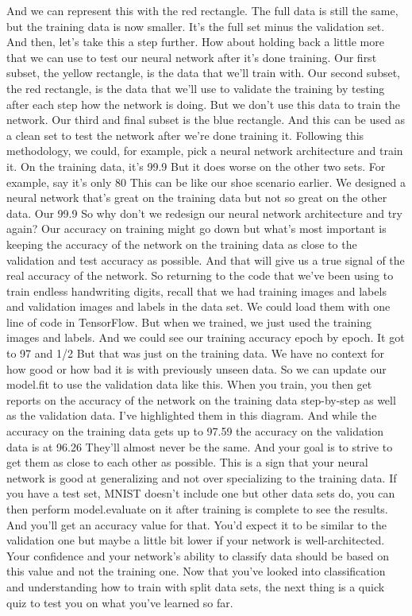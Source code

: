 And we can represent this with the red rectangle.
The full data is still the same, but the training data is now smaller.
It's the full set minus the validation set.
And then, let's take this a step further.
How about holding back a little more that we
can use to test our neural network after it's done training.
Our first subset, the yellow rectangle, is the data that we'll train with.
Our second subset, the red rectangle, is the data
that we'll use to validate the training by testing after each step
how the network is doing.
But we don't use this data to train the network.
Our third and final subset is the blue rectangle.
And this can be used as a clean set to test the network
after we're done training it.
Following this methodology, we could, for example,
pick a neural network architecture and train it.
On the training data, it's 99.9%
But it does worse on the other two sets.
For example, say it's only 80%
This can be like our shoe scenario earlier.
We designed a neural network that's great on the training data
but not so great on the other data.
Our 99.9%
So why don't we redesign our neural network architecture and try again?
Our accuracy on training might go down but what's most important
is keeping the accuracy of the network on the training data
as close to the validation and test accuracy as possible.
And that will give us a true signal of the real accuracy of the network.
So returning to the code that we've been using to train endless handwriting
digits, recall that we had training images and labels
and validation images and labels in the data set.
We could load them with one line of code in TensorFlow.
But when we trained, we just used the training images and labels.
And we could see our training accuracy epoch by epoch.
It got to 97 and 1/2%
But that was just on the training data.
We have no context for how good or how bad it is with previously unseen data.
So we can update our model.fit to use the validation data like this.
When you train, you then get reports on the accuracy
of the network on the training data step-by-step
as well as the validation data.
I've highlighted them in this diagram.
And while the accuracy on the training data gets up to 97.59%
the accuracy on the validation data is at 96.26%
They'll almost never be the same.
And your goal is to strive to get them as close to each other as possible.
This is a sign that your neural network is good at generalizing and not
over specializing to the training data.
If you have a test set, MNIST doesn't include one
but other data sets do, you can then perform model.evaluate on it
after training is complete to see the results.
And you'll get an accuracy value for that.
You'd expect it to be similar to the validation one
but maybe a little bit lower if your network is well-architected.
Your confidence and your network's ability to classify data
should be based on this value and not the training one.
Now that you've looked into classification and understanding
how to train with split data sets, the next thing
is a quick quiz to test you on what you've learned so far.

